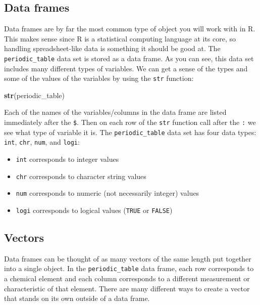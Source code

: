 \documentclass[]{tufte-book}
\newenvironment{Shaded}{\begin{snugshade}}{\end{snugshade}}
\newcommand{\FunctionTok}[1]{\textcolor[rgb]{0.13,0.29,0.53}{\textbf{#1}}}
\newcommand{\NormalTok}[1]{#1}
\providecommand{\tightlist}{%
  \setlength{\itemsep}{0pt}\setlength{\parskip}{0pt}}
\begin{document}
\subsection{Data frames}\label{data-frames}

Data frames are by far the most common type of object you will work with in R. This makes sense since R is a statistical computing language at its core, so handling spreadsheet-like data is something it should be good at. The \texttt{periodic\_table} data set is stored as a data frame. As you can see, this data set includes many different types of variables. We can get a sense of the types and some of the values of the variables by using the \texttt{str} function:

\begin{Shaded}
\begin{Highlighting}[]
\FunctionTok{str}\NormalTok{(periodic\_table)}
\end{Highlighting}
\end{Shaded}

Each of the names of the variables/columns in the data frame are listed immediately after the \texttt{\$}. Then on each row of the \texttt{str} function call after the \texttt{:} we see what type of variable it is. The \texttt{periodic\_table} data set has four data types: \texttt{int}, \texttt{chr}, \texttt{num}, and \texttt{logi}:

\begin{itemize}
\tightlist
\item
  \texttt{int} corresponds to integer values
\item
  \texttt{chr} corresponds to character string values
\item
  \texttt{num} corresponds to numeric (not necessarily integer) values
\item
  \texttt{logi} corresponds to logical values (\texttt{TRUE} or \texttt{FALSE})
\end{itemize}

\subsection{Vectors}\label{vectors}

Data frames can be thought of as many vectors of the same length put together into a single object. In the \texttt{periodic\_table} data frame, each row corresponds to a chemical element and each column corresponds to a different measurement or characteristic of that element. There are many different ways to create a vector that stands on its own outside of a data frame. \newline\vspace*{0.1in}
\end{document}
